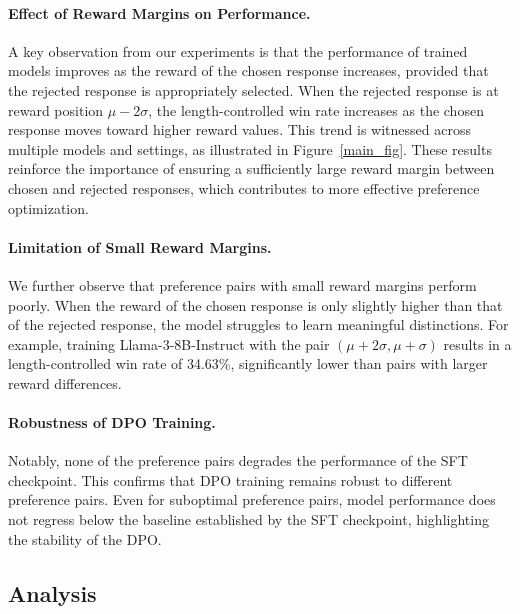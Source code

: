 \paragraph{Effect of Reward Margins on Performance.}
A key observation from our experiments is that the performance of trained models improves as the reward of the chosen response increases, provided that the rejected response is appropriately selected. 
When the rejected response is at reward position \(\mu-2\sigma\), the length-controlled win rate increases as the chosen response moves toward higher reward values. 
This trend is witnessed across multiple models and settings, as illustrated in Figure~\ref{main_fig}. 
These results reinforce the importance of ensuring a sufficiently large reward margin between chosen and rejected responses, which contributes to more effective preference optimization.  

\paragraph{Limitation of Small Reward Margins.}
We further observe that preference pairs with small reward margins perform poorly.  
When the reward of the chosen response is only slightly higher than that of the rejected response, the model struggles to learn meaningful distinctions. 
For example, training Llama-3-8B-Instruct with the pair \((\mu+2\sigma, \mu+\sigma)\) results in a length-controlled win rate of 34.63\%, significantly lower than pairs with larger reward differences. 

\paragraph{Robustness of DPO Training.}
Notably, none of the preference pairs degrades the performance of the SFT checkpoint.
This confirms that DPO training remains robust to different preference pairs. 
Even for suboptimal preference pairs, model performance does not regress below the baseline established by the SFT checkpoint, highlighting the stability of the DPO.  



\subsection{Analysis}

